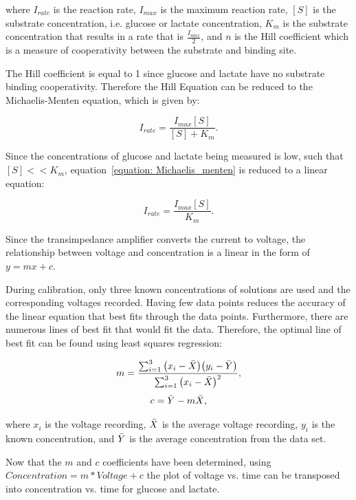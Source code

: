 \noindent where $I_{rate}$ is the reaction rate, $I_{max}$ is the maximum reaction rate, $[S]$ is the substrate concentration, i.e. glucose or lactate concentration, $K_{m}$ is the substrate concentration that results in a rate that is $\frac{I_{max}}{2}$, and $n$ is the Hill coefficient which is a measure of cooperativity between the substrate and binding site.

The Hill coefficient is equal to 1 since glucose and lactate have no substrate binding cooperativity. Therefore the Hill Equation can be reduced to the Michaelis-Menten equation, which is given by:

\begin{equation}
    I_{rate} = \frac{I_{max}[S]}{[S] + K_{m}}.
    \label{equation: Michaelis_menten}
\end{equation}

Since the concentrations of glucose and lactate being measured is low, such that $[S] << K_{m}$, equation~\ref{equation: Michaelis_menten} is reduced to a linear equation:

\begin{equation}
    I_{rate} = \frac{I_{max}[S]}{K_{m}}.
    \label{equation: reduced Michaelis_menten}
\end{equation}

\noindent Since the transimpedance amplifier converts the current to voltage, the relationship between voltage and concentration is a linear in the form of $y = mx + c$.

During calibration, only three known concentrations of solutions are used and the corresponding voltages recorded. Having few data points reduces the accuracy of the linear equation that best fits through the data points. Furthermore, there are numerous lines of best fit that would fit the data. Therefore, the optimal line of best fit can be found using least squares regression:

\begin{equation}
    m = \frac{ \sum_{i=1}^{3} \big( x_{i} - \Bar{X} \big) \big( y_{i} - \Bar{Y} \big) }{ \sum_{i=1}^{3} \big( x_{i} - \Bar{X} \big)^{2} },
    \label{equation: least squares regression}
\end{equation}
\begin{equation}
    c = \Bar{Y} - m\Bar{X},
\end{equation}

\noindent where $x_{i}$ is the voltage recording, $\Bar{X}$ is the average voltage recording, $y_i$ is the known concentration, and $\Bar{Y}$ is the average concentration from the data set. 

Now that the $m$ and $c$ coefficients have been determined, using $Concentration = m*Voltage + c$ the plot of voltage vs. time can be transposed into concentration vs. time for glucose and lactate.





